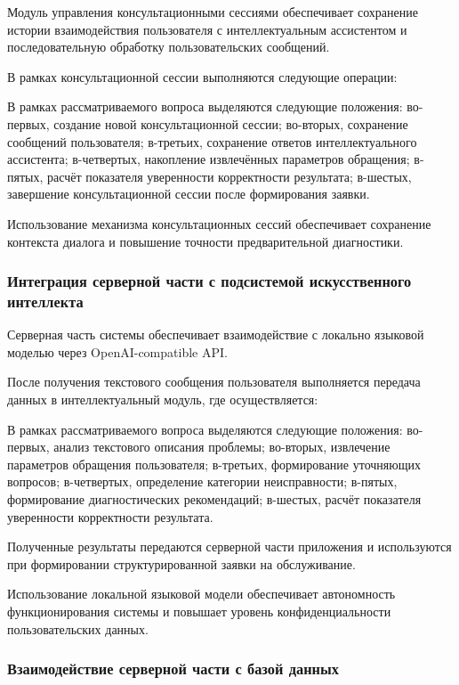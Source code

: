 \documentclass[14pt,a4paper]{extarticle}
\numberwithin{figure}{section}
\numberwithin{table}{section}
\begin{document}
Модуль управления консультационными сессиями обеспечивает сохранение
истории взаимодействия пользователя с интеллектуальным ассистентом и
последовательную обработку пользовательских сообщений.

В рамках консультационной сессии выполняются следующие операции:


В рамках рассматриваемого вопроса выделяются следующие положения: во-первых, создание новой консультационной сессии; во-вторых, сохранение сообщений пользователя; в-третьих, сохранение ответов интеллектуального ассистента; в-четвертых, накопление извлечённых параметров обращения; в-пятых, расчёт показателя уверенности корректности результата; в-шестых, завершение консультационной сессии после формирования заявки.


Использование механизма консультационных сессий обеспечивает сохранение
контекста диалога и повышение точности предварительной диагностики.

\subsubsection{Интеграция серверной части с подсистемой искусственного
интеллекта}

Серверная часть системы обеспечивает взаимодействие с локально
языковой моделью через OpenAI-compatible API.

После получения текстового сообщения пользователя выполняется передача
данных в интеллектуальный модуль, где осуществляется:


В рамках рассматриваемого вопроса выделяются следующие положения: во-первых, анализ текстового описания проблемы; во-вторых, извлечение параметров обращения пользователя; в-третьих, формирование уточняющих вопросов; в-четвертых, определение категории неисправности; в-пятых, формирование диагностических рекомендаций; в-шестых, расчёт показателя уверенности корректности результата.


Полученные результаты передаются серверной части приложения и
используются при формировании структурированной заявки на обслуживание.

Использование локальной языковой модели обеспечивает автономность
функционирования системы и повышает уровень конфиденциальности
пользовательских данных.

\subsubsection{Взаимодействие серверной части с базой данных}
\end{document}
